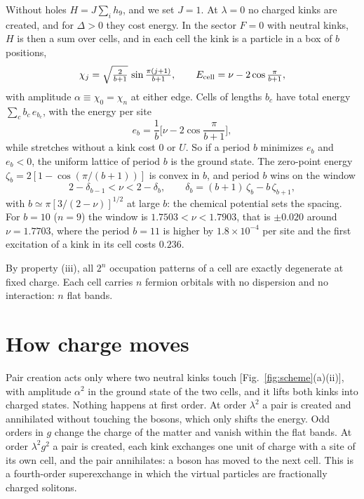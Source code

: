 \documentclass[11pt]{article}
\begin{document}
Without holes $H=J\sum_ih_9$, and we set $J=1$. At $\lambda=0$ no charged kinks are created, and for $\Delta>0$ they cost energy. In the sector $F=0$ with neutral kinks, $H$ is then a sum over cells, and in each cell the kink is a particle in a box of $b$ positions,
\begin{equation}
\chi_j=\sqrt{\tfrac{2}{b+1}}\,\sin\tfrac{\pi(j+1)}{b+1},\qquad E_{\rm cell}=\nu-2\cos\tfrac{\pi}{b+1},
\label{eq:box}
\end{equation}
with amplitude $\alpha\equiv\chi_0=\chi_n$ at either edge. Cells of lengths $b_c$ have total energy $\sum_cb_c\,e_{b_c}$, with the energy per site
\begin{equation}
e_b=\frac1b\Big[\nu-2\cos\frac{\pi}{b+1}\Big],
\label{eq:eb}
\end{equation}
while stretches without a kink cost $0$ or $U$. So if a period $b$ minimizes $e_b$ and $e_b<0$, the uniform lattice of period $b$ is the ground state. The zero-point energy $\zeta_b=2[1-\cos(\pi/(b+1))]$ is convex in $b$, and period $b$ wins on the window
\begin{equation}
2-\delta_{b-1}<\nu<2-\delta_b,\qquad \delta_b=(b+1)\,\zeta_b-b\,\zeta_{b+1},
\label{eq:window}
\end{equation}
with $b\simeq\pi[3/(2-\nu)]^{1/2}$ at large $b$: the chemical potential sets the spacing. For $b=10$ ($n=9$) the window is $1.7503<\nu<1.7903$, that is $\pm0.020$ around $\nu=1.7703$, where the period $b=11$ is higher by $1.8\times10^{-4}$ per site and the first excitation of a kink in its cell costs $0.236$. %

By property (iii), all $2^n$ occupation patterns of a cell are exactly degenerate at fixed charge. Each cell carries $n$ fermion orbitals with no dispersion and no interaction: $n$ flat bands.

\section{How charge moves}\label{sec:charge}

Pair creation acts only where two neutral kinks touch [Fig.~\ref{fig:scheme}(a)(ii)], with amplitude $\alpha^2$ in the ground state of the two cells, and it lifts both kinks into charged states. Nothing happens at first order. At order $\lambda^2$ a pair is created and annihilated without touching the bosons, which only shifts the energy. Odd orders in $g$ change the charge of the matter and vanish within the flat bands. At order $\lambda^2g^2$ a pair is created, each kink exchanges one unit of charge with a site of its own cell, and the pair annihilates: a boson has moved to the next cell. This is a fourth-order superexchange in which the virtual particles are fractionally charged solitons.
\end{document}
